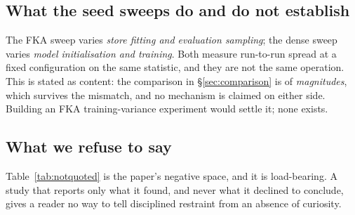 \subsection{What the seed sweeps do and do not establish}

The FKA sweep varies \emph{store fitting and evaluation sampling}; the dense sweep varies
\emph{model initialisation and training}. Both measure run-to-run spread at a fixed configuration on
the same statistic, and they are not the same operation. This is stated as content: the comparison
in \S\ref{sec:comparison} is of \emph{magnitudes}, which survives the mismatch, and no mechanism is
claimed on either side. Building an FKA training-variance experiment would settle it; none exists.

\subsection{What we refuse to say}
\label{sec:refuse}

\begin{table}[t]\centering\small
\caption{The not-quoted table. Each row is a claim the record could be read to support and that we
decline to make, with the reason.}
\label{tab:notquoted}

\end{table}

Table~\ref{tab:notquoted} is the paper's negative space, and it is load-bearing. A study that
reports only what it found, and never what it declined to conclude, gives a reader no way to tell
disciplined restraint from an absence of curiosity.
